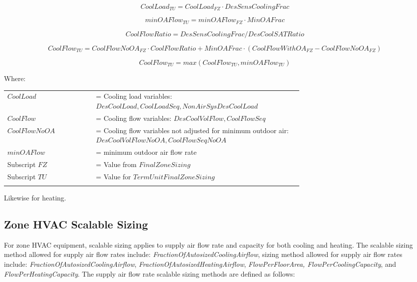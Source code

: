 \begin{equation}
    {CoolLoad_{TU}} = {CoolLoad_{FZ}} \cdot {DesSensCoolingFrac}
\end{equation}

\begin{equation}
    {minOAFlow_{TU}} = {minOAFlow_{FZ}} \cdot {MinOAFrac}
\end{equation}

\begin{equation}
    {CoolFlowRatio} = {DesSensCoolingFrac} / {DesCoolSATRatio}
\end{equation}

{\scriptsize
\begin{equation}
    {CoolFlow_{TU}} = {CoolFlowNoOA_{FZ}} \cdot CoolFlowRatio + {MinOAFrac} \cdot ( {CoolFlowWithOA_{FZ}} - {CoolFlowNoOA_{FZ}} )
\end{equation}}

\begin{equation}
    {CoolFlow_{TU}} = max({CoolFlow_{TU}},{minOAFlow_{TU}})
\end{equation}

Where:

\begin{tabular}{lp{0.7\linewidth}}
\\
    $CoolLoad$ &= Cooling load variables: $DesCoolLoad, CoolLoadSeq, NonAirSysDesCoolLoad$\\
    $CoolFlow$ &= Cooling flow variables: $DesCoolVolFlow, CoolFlowSeq$\\
    $CoolFlowNoOA$ &= Cooling flow variables not adjusted for minimum outdoor air: $DesCoolVolFlowNoOA, CoolFlowSeqNoOA$\\
    $minOAFlow$ &= minimum outdoor air flow rate\\
    Subscript $FZ$ &= Value from $FinalZoneSizing$\\
    Subscript $TU$ &= Value for $TermUnitFinalZoneSizing$\\
\\
\end{tabular}

Likewise for heating.

\subsection{Zone HVAC Scalable Sizing}\label{zone-hvac-scalable-sizing}

For zone HVAC equipment, scalable sizing applies to supply air flow rate and capacity for both cooling and heating. The scalable sizing method allowed for supply air flow rates include: \emph{FractionOfAutosizedCoolingAirflow}, sizing method allowed for supply air flow rates include: \emph{FractionOfAutosizedCoolingAirflow}, \emph{FractionOfAutosizedHeatingAirflow}, \emph{FlowPerFloorArea, FlowPerCoolingCapacity}, and \emph{FlowPerHeatingCapacity}. The supply air flow rate scalable sizing methods are defined as follows:


